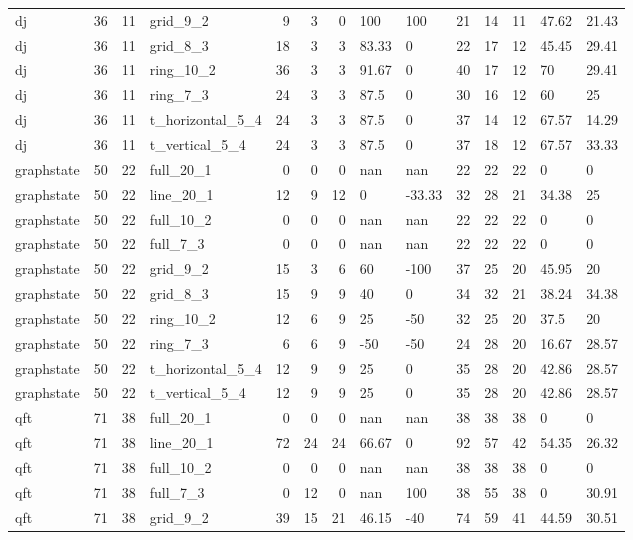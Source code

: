 \begin{longtable}{lrrlrrrllrrrll}
dj & 36 & 11 & grid\_9\_2 & 9 & 3 & 0 & 100 & 100 & 21 & 14 & 11 & 47.62 & 21.43 \\
dj & 36 & 11 & grid\_8\_3 & 18 & 3 & 3 & 83.33 & 0 & 22 & 17 & 12 & 45.45 & 29.41 \\
dj & 36 & 11 & ring\_10\_2 & 36 & 3 & 3 & 91.67 & 0 & 40 & 17 & 12 & 70 & 29.41 \\
dj & 36 & 11 & ring\_7\_3 & 24 & 3 & 3 & 87.5 & 0 & 30 & 16 & 12 & 60 & 25 \\
dj & 36 & 11 & t\_horizontal\_5\_4 & 24 & 3 & 3 & 87.5 & 0 & 37 & 14 & 12 & 67.57 & 14.29 \\
dj & 36 & 11 & t\_vertical\_5\_4 & 24 & 3 & 3 & 87.5 & 0 & 37 & 18 & 12 & 67.57 & 33.33 \\
graphstate & 50 & 22 & full\_20\_1 & 0 & 0 & 0 & nan & nan & 22 & 22 & 22 & 0 & 0 \\
graphstate & 50 & 22 & line\_20\_1 & 12 & 9 & 12 & 0 & -33.33 & 32 & 28 & 21 & 34.38 & 25 \\
graphstate & 50 & 22 & full\_10\_2 & 0 & 0 & 0 & nan & nan & 22 & 22 & 22 & 0 & 0 \\
graphstate & 50 & 22 & full\_7\_3 & 0 & 0 & 0 & nan & nan & 22 & 22 & 22 & 0 & 0 \\
graphstate & 50 & 22 & grid\_9\_2 & 15 & 3 & 6 & 60 & -100 & 37 & 25 & 20 & 45.95 & 20 \\
graphstate & 50 & 22 & grid\_8\_3 & 15 & 9 & 9 & 40 & 0 & 34 & 32 & 21 & 38.24 & 34.38 \\
graphstate & 50 & 22 & ring\_10\_2 & 12 & 6 & 9 & 25 & -50 & 32 & 25 & 20 & 37.5 & 20 \\
graphstate & 50 & 22 & ring\_7\_3 & 6 & 6 & 9 & -50 & -50 & 24 & 28 & 20 & 16.67 & 28.57 \\
graphstate & 50 & 22 & t\_horizontal\_5\_4 & 12 & 9 & 9 & 25 & 0 & 35 & 28 & 20 & 42.86 & 28.57 \\
graphstate & 50 & 22 & t\_vertical\_5\_4 & 12 & 9 & 9 & 25 & 0 & 35 & 28 & 20 & 42.86 & 28.57 \\
qft & 71 & 38 & full\_20\_1 & 0 & 0 & 0 & nan & nan & 38 & 38 & 38 & 0 & 0 \\
qft & 71 & 38 & line\_20\_1 & 72 & 24 & 24 & 66.67 & 0 & 92 & 57 & 42 & 54.35 & 26.32 \\
qft & 71 & 38 & full\_10\_2 & 0 & 0 & 0 & nan & nan & 38 & 38 & 38 & 0 & 0 \\
qft & 71 & 38 & full\_7\_3 & 0 & 12 & 0 & nan & 100 & 38 & 55 & 38 & 0 & 30.91 \\
qft & 71 & 38 & grid\_9\_2 & 39 & 15 & 21 & 46.15 & -40 & 74 & 59 & 41 & 44.59 & 30.51 \\

\end{longtable}
